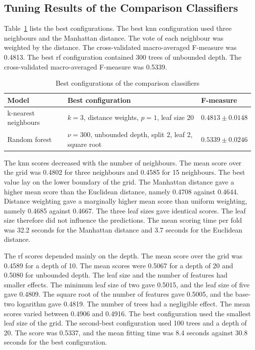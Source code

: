 \documentclass[conference]{IEEEtran}
\begin{document}
\subsection{Tuning Results of the Comparison Classifiers}
\label{sub:res_clf}

Table~\ref{tab:best} lists the best configurations.
The best \gls{knn} configuration used three neighbours and the Manhattan distance.
The vote of each neighbour was weighted by the distance.
The cross-validated macro-averaged F-measure was 0.4813.
The best \gls{rf} configuration contained 300 trees of unbounded depth.
The cross-validated macro-averaged F-measure was 0.5339.

\begin{table}[H]
\centering
\caption{Best configurations of the comparison classifiers}
\label{tab:best}
\footnotesize
\setlength{\tabcolsep}{3pt}
\begin{tabular}{p{0.95in}p{1.4in}p{0.85in}}
\toprule
\textbf{Model} & \textbf{Best configuration} & \textbf{F-measure} \\
\midrule
k-nearest neighbours & $k=3$, distance weights, $p=1$, leaf size 20 & $0.4813 \pm 0.0148$ \\
Random forest & $\nu=300$, unbounded depth, split 2, leaf 2, square root & $0.5339 \pm 0.0246$ \\
\bottomrule
\end{tabular}
\end{table}

The \gls{knn} scores decreased with the number of neighbours.
The mean score over the grid was 0.4802 for three neighbours and 0.4585 for 15 neighbours.
The best value lay on the lower boundary of the grid.
The Manhattan distance gave a higher mean score than the Euclidean distance, namely 0.4708 against 0.4644.
Distance weighting gave a marginally higher mean score than uniform weighting, namely 0.4685 against 0.4667.
The three leaf sizes gave identical scores.
The leaf size therefore did not influence the predictions.
The mean scoring time per fold was 32.2 seconds for the Manhattan distance and 3.7 seconds for the Euclidean distance.

The \gls{rf} scores depended mainly on the depth.
The mean score over the grid was 0.4589 for a depth of 10.
The mean scores were 0.5067 for a depth of 20 and 0.5080 for unbounded depth.
The leaf size and the number of features had smaller effects.
The minimum leaf size of two gave 0.5015, and the leaf size of five gave 0.4809.
The square root of the number of features gave 0.5005, and the base-two logarithm gave 0.4819.
The number of trees had a negligible effect.
The mean scores varied between 0.4906 and 0.4916.
The best configuration used the smallest leaf size of the grid.
The second-best configuration used 100 trees and a depth of 20.
The score was 0.5337, and the mean fitting time was 8.4 seconds against 30.8 seconds for the best configuration.
\end{document}
